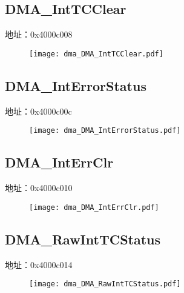 \subsection{DMA\_IntTCClear}
\label{dma-DMA-IntTCClear}
地址：0x4000c008
 \begin{figure}[H]
\texttt{[image: dma\_DMA\_IntTCClear.pdf]}
\end{figure}

\subsection{DMA\_IntErrorStatus}
\label{dma-DMA-IntErrorStatus}
地址：0x4000c00c
 \begin{figure}[H]
\texttt{[image: dma\_DMA\_IntErrorStatus.pdf]}
\end{figure}

\subsection{DMA\_IntErrClr}
\label{dma-DMA-IntErrClr}
地址：0x4000c010
 \begin{figure}[H]
\texttt{[image: dma\_DMA\_IntErrClr.pdf]}
\end{figure}

\subsection{DMA\_RawIntTCStatus}
\label{dma-DMA-RawIntTCStatus}
地址：0x4000c014
 \begin{figure}[H]
\texttt{[image: dma\_DMA\_RawIntTCStatus.pdf]}
\end{figure}


